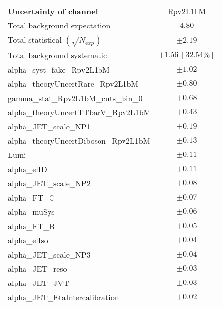 
\begin{table}
\begin{center}
\setlength{\tabcolsep}{0.0pc}
\begin{tabular*}{\textwidth}{@{\extracolsep{\fill}}lc}
\noalign{\smallskip}\hline\noalign{\smallskip}
{\bfseries Uncertainty of channel}                                    & Rpv2L1bM            \\
\noalign{\smallskip}\hline\noalign{\smallskip}
Total background expectation             &  $4.80$       \\
\noalign{\smallskip}\hline\noalign{\smallskip}
Total statistical $(\sqrt{N_{\mathrm exp}})$              & $\pm 2.19$       \\
Total background systematic               & $\pm 1.56\ [32.54\%] $             \\
\noalign{\smallskip}\hline\noalign{\smallskip}
\noalign{\smallskip}\hline\noalign{\smallskip}
alpha\_syst\_fake\_Rpv2L1bM         & $\pm 1.02$       \\
alpha\_theoryUncertRare\_Rpv2L1bM         & $\pm 0.80$       \\
gamma\_stat\_Rpv2L1bM\_cuts\_bin\_0         & $\pm 0.68$       \\
alpha\_theoryUncertTTbarV\_Rpv2L1bM         & $\pm 0.43$       \\
alpha\_JET\_scale\_NP1         & $\pm 0.19$       \\
alpha\_theoryUncertDiboson\_Rpv2L1bM         & $\pm 0.13$       \\
Lumi         & $\pm 0.11$       \\
alpha\_elID         & $\pm 0.11$       \\
alpha\_JET\_scale\_NP2         & $\pm 0.08$       \\
alpha\_FT\_C         & $\pm 0.07$       \\
alpha\_muSys         & $\pm 0.06$       \\
alpha\_FT\_B         & $\pm 0.05$       \\
alpha\_elIso         & $\pm 0.04$       \\
alpha\_JET\_scale\_NP3         & $\pm 0.04$       \\
alpha\_JET\_reso         & $\pm 0.03$       \\
alpha\_JET\_JVT         & $\pm 0.03$       \\
alpha\_JET\_EtaIntercalibration         & $\pm 0.02$       \\

\end{tabular*}
\end{center}
\end{table}
